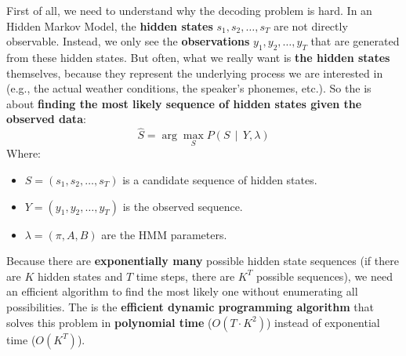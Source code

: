 \highspace
First of all, we need to understand why the decoding problem is hard. In an Hidden Markov Model, the \textbf{hidden states} $s_1, s_2, \ldots, s_T$ are not directly observable. Instead, we only see the \textbf{observations} $y_1, y_2, \ldots, y_T$ that are generated from these hidden states. But often, what we really want is \textbf{the hidden states} themselves, because they represent the underlying process we are interested in (e.g., the actual weather conditions, the speaker's phonemes, etc.). So the  is about \textbf{finding the most likely sequence of hidden states given the observed data}:
\begin{equation*}
    \hat{S} = \arg\max_{S} P\left(S \, \mid \, Y, \lambda\right)
\end{equation*}
Where:
\begin{itemize}
    \item $S = (s_1, s_2, \ldots, s_T)$ is a candidate sequence of hidden states.
    \item $Y = (y_1, y_2, \ldots, y_T)$ is the observed sequence.
    \item $\lambda = (\pi, A, B)$ are the HMM parameters.
\end{itemize}
Because there are \textbf{exponentially many} possible hidden state sequences (if there are $K$ hidden states and $T$ time steps, there are $K^T$ possible sequences), we need an efficient algorithm to find the most likely one without enumerating all possibilities. The  is the \textbf{efficient dynamic programming algorithm} that solves this problem in \textbf{polynomial time} ($O(T \cdot K^2)$) instead of exponential time ($O(K^T)$).


